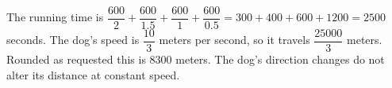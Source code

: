 The running time is $\dfrac{600}{2}+\dfrac{600}{1.5}+\dfrac{600}{1}+\dfrac{600}{0.5}=300+400+600+1200=2500$ seconds. The dog's speed is $\dfrac{10}{3}$ meters per second, so it travels $\dfrac{25000}{3}$ meters. Rounded as requested this is $\boxed{8300}$ meters. The dog's direction changes do not alter its distance at constant speed.
